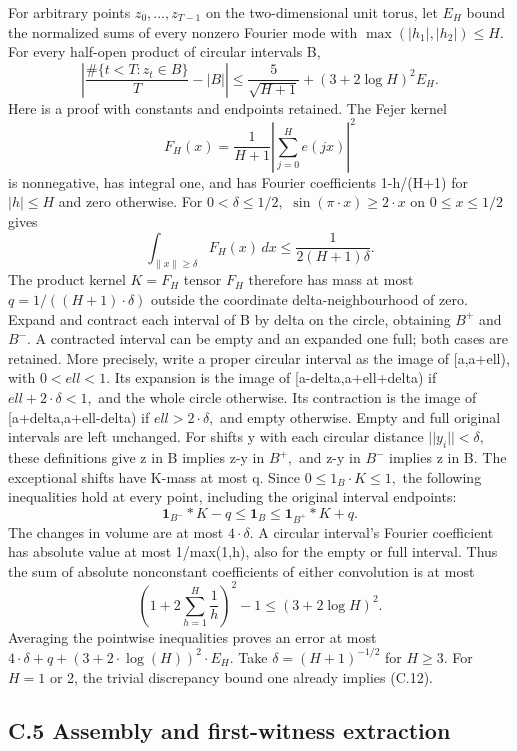 \documentclass[11pt,a4paper]{article}
\begin{document}
For arbitrary points \(z_0,...,z_{T-1}\) on the two-dimensional unit
torus, let \(E_H\) bound the normalized sums of every nonzero Fourier
mode with \(\max(|h_1|,|h_2|)\le H.\) For every half-open product of
circular intervals B, \[
\left|\frac{\#\{t<T:z_t\in B\}}T-|B|\right|
\le\frac5{\sqrt{H+1}}+(3+2\log H)^2E_H. \tag{C.12}
\] Here is a proof with constants and endpoints retained. The Fejer
kernel \[
F_H(x)=\frac1{H+1}\left|\sum_{j=0}^H e(jx)\right|^2
\] is nonnegative, has integral one, and has Fourier coefficients
1-\textbar h\textbar/(H+1) for \(|h|\le H\) and zero otherwise. For
\(0<\delta\le 1/2,\) \(\sin(\pi\cdot x)\ge 2\cdot x\) on
\(0\le x\le 1/2\) gives \[
\int_{\|x\|\ge\delta}F_H(x)\,dx
\le\frac1{2(H+1)\delta}.
\] The product kernel \(K=F_H\) tensor \(F_H\) therefore has mass at
most \(q=1/((H+1)\cdot \delta)\) outside the coordinate
delta-neighbourhood of zero. Expand and contract each interval of B by
delta on the circle, obtaining \(B^+\) and \(B^-.\) A contracted
interval can be empty and an expanded one full; both cases are retained.
More precisely, write a proper circular interval as the image of
{[}a,a+ell), with \(0<ell<1.\) Its expansion is the image of
{[}a-delta,a+ell+delta) if \(ell+2\cdot \delta<1,\) and the whole circle
otherwise. Its contraction is the image of {[}a+delta,a+ell-delta) if
\(ell>2\cdot \delta,\) and empty otherwise. Empty and full original
intervals are left unchanged. For shifts y with each circular distance
\(||y_i||<\delta,\) these definitions give z in B implies z-y in
\(B^+,\) and z-y in \(B^-\) implies z in B. The exceptional shifts have
K-mass at most q. Since \(0\le 1_B\cdot K\le 1,\) the following
inequalities hold at every point, including the original interval
endpoints: \[
\mathbf1_{B^-}*K-q\le\mathbf1_B\le\mathbf1_{B^+}*K+q.
\] The changes in volume are at most \(4\cdot \delta.\) A circular
interval's Fourier coefficient has absolute value at most
1/max(1,\textbar h\textbar), also for the empty or full interval. Thus
the sum of absolute nonconstant coefficients of either convolution is at
most \[
\left(1+2\sum_{h=1}^H\frac1h\right)^2-1
\le(3+2\log H)^2.
\] Averaging the pointwise inequalities proves an error at most
\(4\cdot \delta+q+(3+2\cdot \log(H))^2\cdot E_H.\) Take
\(\delta=(H+1)^{-1/2}\) for \(H\ge 3.\) For \(H=1\) or 2, the trivial
discrepancy bound one already implies (C.12).

\subsection{C.5 Assembly and first-witness
extraction}\label{c.5-assembly-and-first-witness-extraction}
\end{document}
